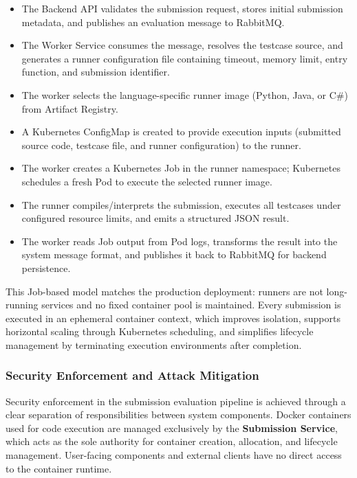 \begin{itemize}
\item The Backend API validates the submission request, stores initial submission metadata, and publishes an evaluation message to RabbitMQ.
\item The Worker Service consumes the message, resolves the testcase source, and generates a runner configuration file containing timeout, memory limit, entry function, and submission identifier.
\item The worker selects the language-specific runner image (Python, Java, or C\#) from Artifact Registry.
\item A Kubernetes ConfigMap is created to provide execution inputs (submitted source code, testcase file, and runner configuration) to the runner.
\item The worker creates a Kubernetes Job in the runner namespace; Kubernetes schedules a fresh Pod to execute the selected runner image.
\item The runner compiles/interprets the submission, executes all testcases under configured resource limits, and emits a structured JSON result.
\item The worker reads Job output from Pod logs, transforms the result into the system message format, and publishes it back to RabbitMQ for backend persistence.
\end{itemize}

This Job-based model matches the production deployment: runners are not long-running services and no fixed container pool is maintained. Every submission is executed in an ephemeral container context, which improves isolation, supports horizontal scaling through Kubernetes scheduling, and simplifies lifecycle management by terminating execution environments after completion.

\subsubsection{Security Enforcement and Attack Mitigation}

Security enforcement in the submission evaluation pipeline is achieved through a clear separation of responsibilities between system components. Docker containers used for code execution are managed exclusively by the \textbf{Submission Service}, which acts as the sole authority for container creation, allocation, and lifecycle management. User-facing components and external clients have no direct access to the container runtime.

